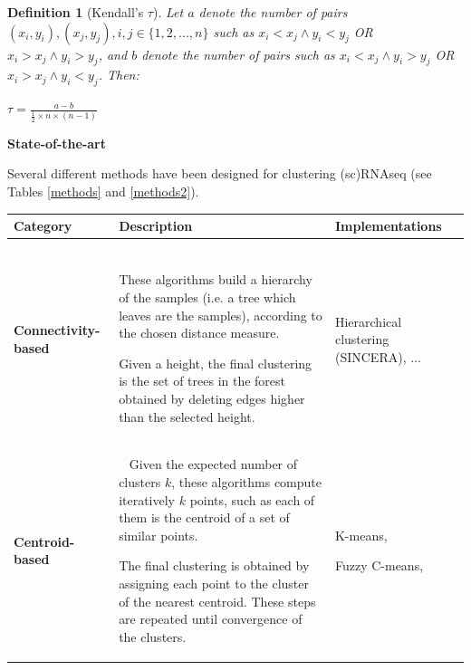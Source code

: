 \documentclass{report}
\newtheorem{definition}{Definition}[section]
\begin{document}
{\begin{definition}[Kendall's $\tau$]
{Let $a$ denote the number of pairs $(x_i, y_i), (x_j, y_j), i,j \in \{1,2, ..., n\}$ such as $x_i <  x_j \land y_i < y_j$ OR $x_i >  x_j \land y_i > y_j$, and $b$ denote the number of pairs such as $x_i <  x_j \land y_i > y_j$ OR $x_i >  x_j \land y_i < y_j$. Then:

\begin{center} $\tau = \frac{a-b}{\frac{1}{2} \times n \times (n - 1)}$ \end{center}}\end{definition}

\newpage

\bigskip
\noindent \textbf{State-of-the-art}
\bigskip

Several different methods have been designed for clustering (sc)RNAseq (see Tables \ref{methods} and \ref{methods2}).

\begin{table}[H]
\centering
\begin{tabular}{| l | l | l | l |}
\hline
\parbox[c]{5cm}{\textbf{Category}} & 
\parbox[c]{5cm}{\textbf{Description}} &
\parbox[c]{5cm}{\textbf{Implementations}}\\
\hline
\parbox[c]{5cm}{\textbf{Connectivity-based}} & 
\parbox[c]{5cm}{~\\ These algorithms build a hierarchy of the samples (i.e. a tree which leaves are the samples), according to the chosen distance measure.\\

Given a height, the final clustering is the set of trees in the forest obtained by deleting edges higher than the selected height. \newline} &
\parbox[c]{5cm}{Hierarchical clustering\\(SINCERA\cite{guo2015sincera}), ...}\\
\hline
\parbox[c]{5cm}{\textbf{Centroid-based}} & 
\parbox[c]{5cm}{~\\ Given the expected number of clusters $k$, these algorithms compute iteratively $k$ points, such as each of them 
is the centroid of a set of similar points.\\ 

The final clustering is obtained by assigning each point to the cluster of the nearest centroid. These steps are repeated until convergence of the clusters.\newline} &
\parbox[c]{5cm}{K-means\cite{macqueen1967some}\cite{tseng2007penalized},\\

Fuzzy C-means\cite{dunn1973fuzzy}\cite{filippone2005unsupervised},\\

}
\end{tabular}
\end{table}}
\end{document}
